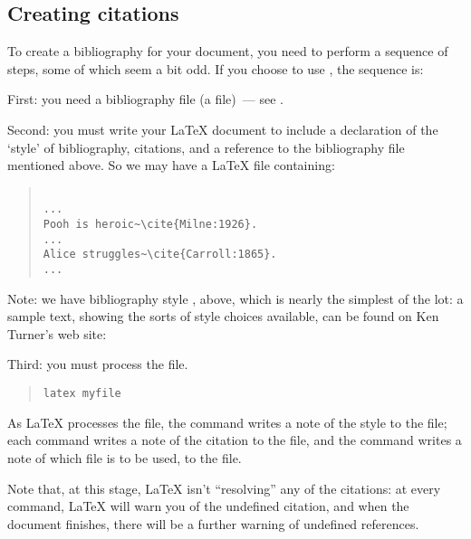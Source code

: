 \subsection{Creating citations}


To create a bibliography for your document, you need to perform a
sequence of steps, some of which seem a bit odd.  If you choose to use
\BibTeX{}, the sequence is:

First: you need a \BibTeX{} bibliography file (a 
file)~--- see .

Second: you must write your \LaTeX{} document to include a declaration
of the `style' of bibliography, citations, and a reference to the
bibliography file mentioned above.  So we may have a \LaTeX{}
file containing:
\begin{quote}
\begin{verbatim}

...
Pooh is heroic~\cite{Milne:1926}.
...
Alice struggles~\cite{Carroll:1865}.
...

\end{verbatim}
\end{quote}
Note: we have bibliography style , above, which is
nearly the simplest of the lot: a sample text, showing the sorts of
style choices available, can be found on Ken Turner's web site:

Third: you must process the file.
\begin{quote}
\begin{verbatim}
latex myfile
\end{verbatim}
\end{quote}
As \LaTeX{} processes the file, the  command
writes a note of the style to the  file; each
 command writes a note of the citation to the
 file, and the  command writes a note
of which  file is to be used, to the  file.

Note that, at this stage, \LaTeX{} isn't ``resolving'' any of the
citations: at every  command, \LaTeX{} will warn you of the
undefined citation, and when the document finishes, there will be a
further warning of undefined references.


